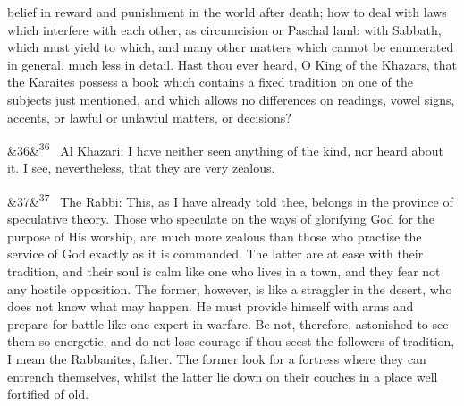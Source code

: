 \documentclass[12pt]{article}
\newcommand{\para}[1][]{\par\noindent\ifx&#1&\else\textsuperscript{\footnotesize #1}~\fi}
\begin{document}
belief in reward and punishment in the world after death; how to deal with laws which interfere with each other, as circumcision or Paschal lamb with Sabbath, which must yield to which, and many other matters which cannot be enumerated in general, much less in detail. Hast thou ever heard, O King of the Khazars, that the Karaites possess a book which contains a fixed tradition on one of the subjects just mentioned, and which allows no differences on readings, vowel signs, accents, or lawful or unlawful matters, or decisions?

\para[36] Al Khazari: I have neither seen anything of the kind, nor heard about it. I see, nevertheless, that they are very zealous.

\para[37] The Rabbi: This, as I have already told thee, belongs in the province of speculative theory. Those who speculate on the ways of glorifying God for the purpose of His worship, are much more zealous than those who practise the service of God exactly as it is commanded. The latter are at ease with their tradition, and their soul is calm like one who lives in a town, and they fear not any hostile opposition. The former, however, is like a straggler in the desert, who does not know what may happen. He must provide himself with arms and prepare for battle like one expert in warfare. Be not, therefore, astonished to see them so energetic, and do not lose courage if thou seest the followers of tradition, I mean the Rabbanites, falter. The former look for a fortress where they can entrench themselves, whilst the latter lie down on their couches in a place well fortified of old.
\end{document}
